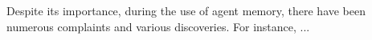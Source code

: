 \documentclass{llmxive}
\begin{document}
Despite its importance, during the use of agent memory, there have been numerous complaints and various discoveries. For instance, ... %
\end{document}
